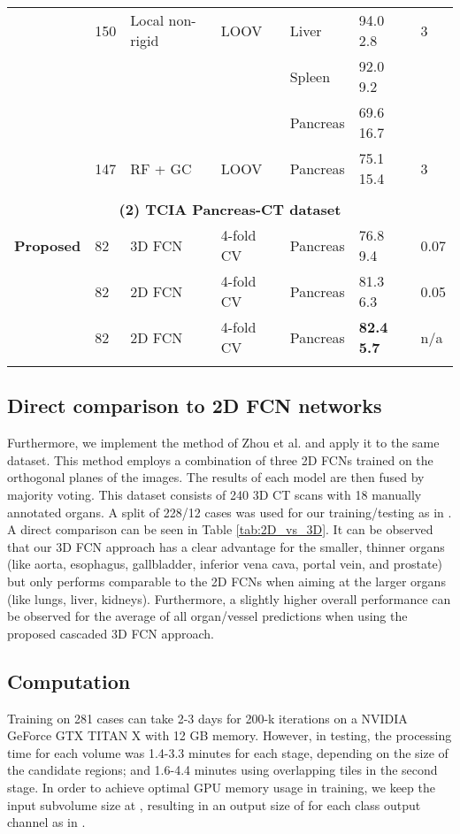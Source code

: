 \documentclass[authoryear]{elsarticle}
\begin{document}
\begin{table}[ph!]
\begin{tabularx}{\linewidth}{*{7}{X}}
		\rowcolor[gray]{.9}\citet{wolz2013automated}  & 150      & Local non-rigid & LOOV & Liver & 94.0  2.8 & 3 \\
		\rowcolor[gray]{.9}      &       &       &       & Spleen & 92.0  9.2 &  \\
		\rowcolor[gray]{.9}      &       &       &       & Pancreas & 69.6  16.7 &  \\
		\citet{oda2016regression} & 147   & RF + GC & LOOV & Pancreas & 75.1  15.4 & 3 \\
		\hline
		&  &  &  &  &  &  \tabularnewline
		\multicolumn{7}{c}{\textbf{(2) TCIA Pancreas-CT dataset}} \tabularnewline
		\hline
		\textbf{Proposed} & 82    & 3D FCN & 4-fold CV & Pancreas & 76.8  9.4 & 0.07 \\ \rowcolor[gray]{.9}\rowcolor[gray]{.9}\citet{roth2017spatial} & 82    & 2D FCN & 4-fold CV & Pancreas & 81.3  6.3 & 0.05 \\
		\citet{zhou2016pancreas} & 82    & 2D FCN & 4-fold CV & Pancreas & \textbf{82.4 5.7} & n/a \\
		\hline
		&  &  &  &  &  &  \tabularnewline
\end{tabularx}\end{table}\clearpage
\newpage 
\subsection{Direct comparison to 2D FCN networks} 
Furthermore, we implement the method of Zhou et al. \citep{zhou2016three, zhou2017deep} and apply it to the same dataset. This method employs a combination of three 2D FCNs trained on the orthogonal planes of the images. The results of each model are then fused by majority voting. This dataset consists of 240 3D CT scans with 18 manually annotated organs. A split of 228/12 cases was used for our training/testing as in \citep{zhou2016three, zhou2017deep}. A direct comparison can be seen in Table \ref{tab:2D_vs_3D}. It can be observed that our 3D FCN approach has a clear advantage for the smaller, thinner organs (like aorta, esophagus, gallbladder, inferior vena cava, portal vein, and prostate) but only performs comparable to the 2D FCNs when aiming at the larger organs (like lungs, liver, kidneys). Furthermore, a slightly higher overall performance can be observed for the average of all organ/vessel predictions when using the proposed cascaded 3D FCN approach.
\subsection{Computation} Training on 281 cases can take 2-3 days for 200-k iterations on a NVIDIA GeForce GTX TITAN X with 12 GB memory. However, in testing, the processing time for each volume was 1.4-3.3 minutes for each stage, depending on the size of the candidate regions; and 1.6-4.4 minutes using overlapping tiles in the second stage.
\textcolor{revision}{In order to achieve optimal GPU memory usage in training, we keep the input subvolume size at , resulting in an output size of  for each class output channel as in \citep{cciccek20163d}.}
\end{document}

